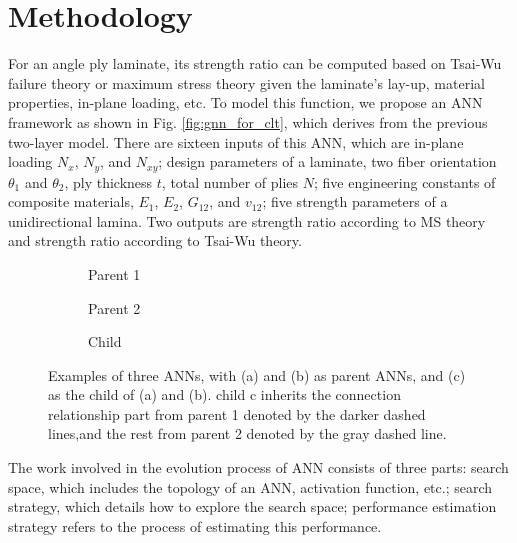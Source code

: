 \section{Methodology}
For an angle ply laminate, its strength ratio can be computed based on Tsai-Wu
failure theory or maximum stress theory given the laminate's lay-up, material properties,
in-plane loading, etc. To model this function, we propose an
ANN framework as shown in Fig. \ref{fig:gnn_for_clt}, which derives from the previous
two-layer model. There are sixteen inputs of this ANN, which are in-plane
loading $N_x$, $N_y$, and $N_{xy}$; design parameters of a laminate, two 
fiber orientation $\theta_1$ and $\theta_2$, ply thickness $t$, total
number of plies $N$; 
five engineering constants of composite materials,
$E_1$, $E_2$, $G_{12}$, and $v_{12}$; five strength parameters of a
unidirectional lamina.  Two outputs are strength ratio according to MS theory
and strength ratio according to Tsai-Wu theory.



\begin{figure}[t]
	\centering
	\begin{subfigure}[b]{1.0\linewidth}
		\centering
		
		\caption{Parent 1}
	\end{subfigure}
	\newline
	\begin{subfigure}[b]{1.0\linewidth}
		\centering
		
		\caption{Parent 2}
	\end{subfigure}
	\newline
	\begin{subfigure}[b]{1.0\linewidth}
		\centering
		
		\caption{Child}
	\end{subfigure}
	\caption{Examples of three ANNs, with (a) and (b) as parent ANNs, and (c) as
		the child of (a) and (b). child c inherits the connection relationship
		part from parent 1 denoted by the darker dashed lines,and the rest from
		parent 2 denoted by the gray dashed line.}
		\label{fig:anns}
\end{figure}


The work involved in the evolution process of ANN consists of three parts:
search space, which includes the topology of an ANN, activation function, etc.;
search strategy, which details how to explore the search space; performance
estimation strategy refers to the process of estimating this performance.

